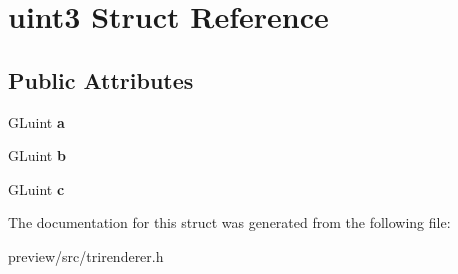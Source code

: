 \hypertarget{structuint3}{}\section{uint3 Struct Reference}
\label{structuint3}
\subsection*{Public Attributes}
\begin{DoxyCompactItemize}
\item 
\hypertarget{structuint3_ad39b53a9e887b32825653ebc69600c39}{}G\+Luint {\bfseries a}\label{structuint3_ad39b53a9e887b32825653ebc69600c39}

\item 
\hypertarget{structuint3_a0142d6201386e26b810a573b0398114c}{}G\+Luint {\bfseries b}\label{structuint3_a0142d6201386e26b810a573b0398114c}

\item 
\hypertarget{structuint3_aa5ca4d25316a3c093dd052048ff10f89}{}G\+Luint {\bfseries c}\label{structuint3_aa5ca4d25316a3c093dd052048ff10f89}

\end{DoxyCompactItemize}


The documentation for this struct was generated from the following file\+:\begin{DoxyCompactItemize}
\item 
preview/src/trirenderer.\+h\end{DoxyCompactItemize}
